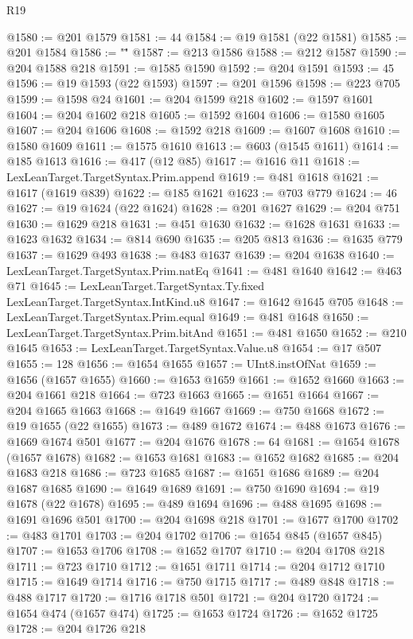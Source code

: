 \begin{lexlean}{R19}
\begin{coremodule}
{{{{{{@1580 := @201 @1579
@1581 := 44
@1584 := @19 @1581 (@22 @1581)
@1585 := @201 @1584
@1586 := "\""
@1587 := @213 @1586
@1588 := @212 @1587
@1590 := @204 @1588 @218
@1591 := @1585 @1590
@1592 := @204 @1591
@1593 := 45
@1596 := @19 @1593 (@22 @1593)
@1597 := @201 @1596
@1598 := @223 @705
@1599 := @1598 @24
@1601 := @204 @1599 @218
@1602 := @1597 @1601
@1604 := @204 @1602 @218
@1605 := @1592 @1604
@1606 := @1580 @1605
@1607 := @204 @1606
@1608 := @1592 @218
@1609 := @1607 @1608
@1610 := @1580 @1609
@1611 := @1575 @1610
@1613 := @603 (@1545 @1611)
@1614 := @185 @1613
@1616 := @417 (@12 @85)
@1617 := @1616 @11
@1618 := LexLeanTarget.TargetSyntax.Prim.append
@1619 := @481 @1618
@1621 := @1617 (@1619 @839)
@1622 := @185 @1621
@1623 := @703 @779
@1624 := 46
@1627 := @19 @1624 (@22 @1624)
@1628 := @201 @1627
@1629 := @204 @751
@1630 := @1629 @218
@1631 := @451 @1630
@1632 := @1628 @1631
@1633 := @1623 @1632
@1634 := @814 @690
@1635 := @205 @813
@1636 := @1635 @779
@1637 := @1629 @493
@1638 := @483 @1637
@1639 := @204 @1638
@1640 := LexLeanTarget.TargetSyntax.Prim.natEq
@1641 := @481 @1640
@1642 := @463 @71
@1645 := LexLeanTarget.TargetSyntax.Ty.fixed LexLeanTarget.TargetSyntax.IntKind.u8
@1647 := @1642 @1645 @705
@1648 := LexLeanTarget.TargetSyntax.Prim.equal
@1649 := @481 @1648
@1650 := LexLeanTarget.TargetSyntax.Prim.bitAnd
@1651 := @481 @1650
@1652 := @210 @1645
@1653 := LexLeanTarget.TargetSyntax.Value.u8
@1654 := @17 @507
@1655 := 128
@1656 := @1654 @1655
@1657 := UInt8.instOfNat
@1659 := @1656 (@1657 @1655)
@1660 := @1653 @1659
@1661 := @1652 @1660
@1663 := @204 @1661 @218
@1664 := @723 @1663
@1665 := @1651 @1664
@1667 := @204 @1665 @1663
@1668 := @1649 @1667
@1669 := @750 @1668
@1672 := @19 @1655 (@22 @1655)
@1673 := @489 @1672
@1674 := @488 @1673
@1676 := @1669 @1674 @501
@1677 := @204 @1676
@1678 := 64
@1681 := @1654 @1678 (@1657 @1678)
@1682 := @1653 @1681
@1683 := @1652 @1682
@1685 := @204 @1683 @218
@1686 := @723 @1685
@1687 := @1651 @1686
@1689 := @204 @1687 @1685
@1690 := @1649 @1689
@1691 := @750 @1690
@1694 := @19 @1678 (@22 @1678)
@1695 := @489 @1694
@1696 := @488 @1695
@1698 := @1691 @1696 @501
@1700 := @204 @1698 @218
@1701 := @1677 @1700
@1702 := @483 @1701
@1703 := @204 @1702
@1706 := @1654 @845 (@1657 @845)
@1707 := @1653 @1706
@1708 := @1652 @1707
@1710 := @204 @1708 @218
@1711 := @723 @1710
@1712 := @1651 @1711
@1714 := @204 @1712 @1710
@1715 := @1649 @1714
@1716 := @750 @1715
@1717 := @489 @848
@1718 := @488 @1717
@1720 := @1716 @1718 @501
@1721 := @204 @1720
@1724 := @1654 @474 (@1657 @474)
@1725 := @1653 @1724
@1726 := @1652 @1725
@1728 := @204 @1726 @218
}}}}}}
\end{coremodule}
\end{lexlean}
